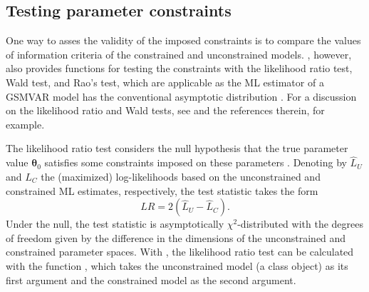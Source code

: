 \documentclass[nojss]{jss}
\begin{document}
\subsection{Testing parameter constraints}\label{sec:testconst}
One way to asses the validity of the imposed constraints is to compare the values of information criteria of the constrained and unconstrained models. , however, also provides functions for testing the constraints with the likelihood ratio test, Wald test, and Rao's test, which are applicable as the ML estimator of a GSMVAR model has the conventional asymptotic distribution \cite[as long as the model is correctly specified and one is willing to assume the validity of the required unverified assumptions; see][Theorem 3, and \cite{Kalliovirta+Meitz+Saikkonen:2016}, Theorem 3]{Virolainen2:2021}. For a discussion on the likelihood ratio and Wald tests, see \citet{Buse:1982} and the references therein, for example.

The likelihood ratio test considers the null hypothesis that the true parameter value $\boldsymbol{\theta}_0$ satisfies some constraints imposed on these parameters \cite[such that the constrained parameter space is a subset of the parameter space, which is presented in][Assumption 2 for the GSMVAR models]{Virolainen2:2021}. Denoting by $\hat{L}_U$ and $\hat{L}_C$ the (maximized) log-likelihoods based on the unconstrained and constrained ML estimates, respectively, the test statistic takes the form
\begin{equation}
LR=2(\hat{L}_U - \hat{L}_C).
\end{equation}
Under the null, the test statistic is asymptotically $\chi^2$-distributed with the degrees of freedom given by the difference in the dimensions of the unconstrained and constrained parameter spaces. With , the likelihood ratio test can be calculated with the function , which takes the unconstrained model (a class  object) as its first argument and the constrained model as the second argument.
\end{document}
